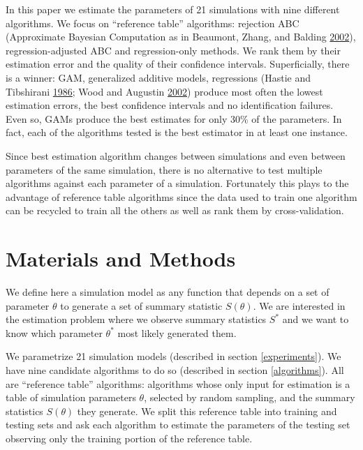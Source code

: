 \documentclass[]{article}
\begin{document}
In this paper we estimate the parameters of 21 simulations with nine different algorithms.
We focus on ``reference table'' algorithms: rejection ABC (Approximate Bayesian Computation as in Beaumont, Zhang, and Balding \protect\hyperlink{ref-Beaumont2002}{2002}), regression-adjusted ABC and regression-only methods.
We rank them by their estimation error and the quality of their confidence intervals.
Superficially, there is a winner: GAM, generalized additive models, regressions (Hastie and Tibshirani \protect\hyperlink{ref-Hastie1986}{1986}; Wood and Augustin \protect\hyperlink{ref-Wood2002}{2002}) produce most often the lowest estimation errors, the best confidence intervals and no identification failures.
Even so, GAMs produce the best estimates for only 30\% of the parameters. In fact, each of the algorithms tested is the best estimator in at least one instance.

Since best estimation algorithm changes between simulations and even between parameters of the same simulation, there is no alternative to test multiple algorithms against each parameter of a simulation.
Fortunately this plays to the advantage of reference table algorithms since the data used to train one algorithm can be recycled to train all the others as well as rank them by cross-validation.

\hypertarget{materials-and-methods}{%
\section{Materials and Methods}\label{materials-and-methods}}

We define here a simulation model as any function that depends on a set of parameter \(\theta\) to generate a set of summary statistic \(S(\theta)\).
We are interested in the estimation problem where we observe summary statistics \(S^*\) and we want to know which parameter \(\theta^*\) most likely generated them.

We parametrize 21 simulation models (described in section \ref{experiments}).
We have nine candidate algorithms to do so (described in section \ref{algorithms}).
All are ``reference table'' algorithms: algorithms whose only input for estimation is a table of simulation parameters \(\theta\), selected by random sampling, and the summary statistics \(S(\theta)\) they generate.
We split this reference table into training and testing sets and ask each algorithm to estimate the parameters of the testing set observing only the training portion of the reference table.
\end{document}
